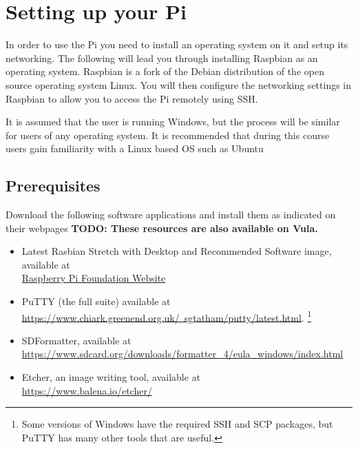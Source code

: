 \section{Setting up your Pi}
In order to use the Pi you need to install an operating system on it and setup its networking.  The following will lead you through installing Raspbian as an operating system.  Raspbian  is a fork of the Debian distribution of the open source operating system Linux.  You will then configure the networking settings in Raspbian to allow you to access the Pi remotely using SSH.  

It is assumed that the user is running Windows, but the process will be similar for users of any operating system. It is recommended that during this course users gain familiarity with a Linux based OS such as Ubuntu

\subsection{Prerequisites}
\label{sec:Prereqs}
Download the following software applications and install them as indicated on their webpages
\textbf{TODO: These resources are also available on Vula.}
\begin{itemize}
    \item Latest Rasbian Stretch with Desktop and Recommended Software image, available at\\ \href{https://www.raspberrypi.org/downloads/raspbian}{Raspberry Pi Foundation Website}
    \item PuTTY (the full suite) available at\\ \href{https://www.chiark.greenend.org.uk/~sgtatham/putty/latest.html}{https://www.chiark.greenend.org.uk/~sgtatham/putty/latest.html}. \footnote{Some versions of Windows have the required SSH and SCP packages, but PuTTY has many other tools that are useful.}
    \item SDFormatter, available at\\ \href{https://www.sdcard.org/downloads/formatter_4/eula_windows/index.html}{https://www.sdcard.org/downloads/formatter\_4/eula\_windows/index.html}
    \item Etcher, an image writing tool, available at\\
    \href{https://www.balena.io/etcher/}{https://www.balena.io/etcher/}
\end{itemize}

